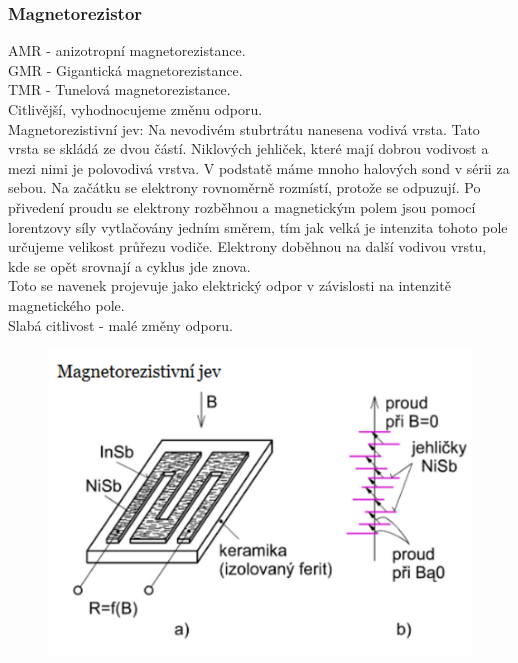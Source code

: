 \subsubsection{Magnetorezistor}
AMR - anizotropní magnetorezistance.\\
GMR - Gigantická magnetorezistance.\\
TMR - Tunelová magnetorezistance.\\
Citlivější, vyhodnocujeme změnu odporu.\\
Magnetorezistivní jev: Na nevodivém stubrtrátu nanesena vodivá vrsta. Tato vrsta se skládá ze dvou částí. Niklových jehliček, které mají dobrou vodivost a mezi nimi je polovodivá vrstva. V podstatě máme mnoho halových sond v sérii za sebou. Na začátku se elektrony rovnoměrně rozmístí, protože se odpuzují. Po přivedení proudu se elektrony rozběhnou a magnetickým polem jsou pomocí lorentzovy síly vytlačovány jedním směrem, tím jak velká je intenzita tohoto pole určujeme velikost průřezu vodiče. Elektrony doběhnou na další vodivou vrstu, kde se opět srovnají a cyklus jde znova.\\
Toto se navenek projevuje jako elektrický odpor v závislosti na intenzitě magnetického pole.\\
Slabá citlivost - malé změny odporu.\\
\newpage
\begin{figure}[h!]
    \centering
    \includegraphics[scale = 0.1]{img/MagnetoRez.png}
\end{figure}

